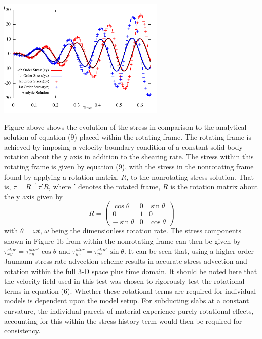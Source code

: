 \begin{center}
\includegraphics[width=8cm]{images/viscoelasticity/famc14b}\\
\end{center}

Figure above shows the evolution of the stress in comparison to the analytical solution of equation (9)
placed within the rotating frame. The rotating frame is achieved by imposing a velocity boundary condition
of a constant solid body rotation about the y axis in addition to the shearing rate. The stress within this
rotating frame is given by equation (9), with the stress in the nonrotating frame found by 
applying a rotation matrix, $R$, to the nonrotating stress solution. 
That is, $\tau=R^{-1}\tau'R$, where $'$ denotes the rotated frame, $R$ is
the rotation matrix about the y axis given by 
\[
R= \left(
\begin{array}{ccc}
\cos\theta &0 & \sin\theta \\
0 & 1 & 0 \\
-\sin\theta & 0 & \cos\theta
\end{array}
\right)
\]
with $\theta=\omega t$, $\omega$ being the dimensionless rotation rate. 
The stress components shown in Figure 1b from within the 
nonrotating frame can then be given by $\tau^{stor}_{xy}=\tau^{stor'}_{xy} \cos\theta$
and $\tau^{stor}_{yz}=\tau^{stor'}_{yz} \sin\theta$.
It can be seen that, using a higher-order Jaumann stress rate advection scheme 
results in accurate stress advection and rotation within the full
3-D space plus time domain. It should be noted here that the velocity field used in 
this test was chosen to rigorously test the rotational terms in equation (6). 
Whether these rotational terms are required for individual models is dependent upon 
the model setup. For subducting slabs at a constant curvature, the individual 
parcels of material experience purely rotational effects, accounting for this within the stress history term
would then be required for consistency.

